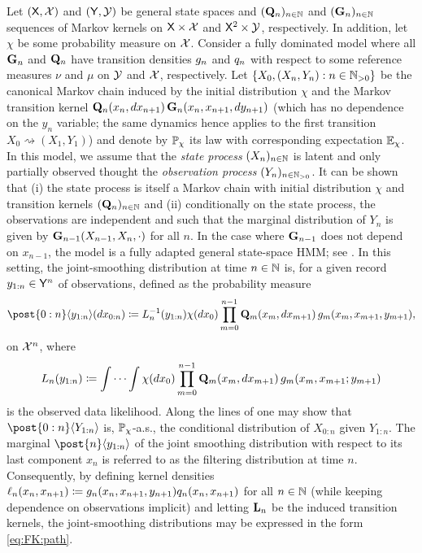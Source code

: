 \begin{example}
\label{ex:state-space:models}
Let $(\mathsf{X}, \mathcal{X})$ and $(\mathsf{Y}, \mathcal{Y})$ be general state spaces and $(\mathbf{Q}_n)_{n \in \mathbb{N}}$ and $(\mathbf{G}_n)_{n \in \mathbb{N}}$ sequences of Markov kernels on $\mathsf{X} \times \mathcal{X}$ and $\mathsf{X}^2 \times \mathcal{Y}$, respectively. In addition, let $\chi$ be some probability measure on $\mathcal{X}$. Consider a fully dominated model where all $\mathbf{G}_n$ and $\mathbf{Q}_n$ have transition densities $g_{n}$ and $q_{n}$ with respect to some reference measures $\nu$ and $\mu$ on $\mathcal{Y}$ and $\mathcal{X}$, respectively. Let $\{X_0, (X_n, Y_n) : n \in \mathbb{N}_{> 0}\}$ be the canonical Markov chain induced by the initial distribution $\chi$ and the Markov transition kernel $\mathbf{Q}_n(x_n, d x_{n + 1}) \, \mathbf{G}_n(x_n, x_{n + 1}, d y_{n + 1})$ (which has no dependence on the $y_n$ variable; the same dynamics hence applies to the first transition $X_0 \rightsquigarrow (X_1, Y_1)$) and denote by $\mathbb{P}_\chi$ its law with corresponding expectation $\mathbb{E}_\chi$. In this model, we assume that the \emph{state process} $(X_n)_{n \in \mathbb{N}}$ is latent and only partially observed thought the \emph{observation process} $(Y_n)_{n \in \mathbb{N}_{> 0}}$. It can be shown that (i) the state process is itself a Markov chain with initial distribution $\chi$ and transition kernels $(\mathbf{Q}_n)_{n \in \mathbb{N}}$ and (ii) conditionally on the state process, the observations are independent and such that the marginal distribution of $Y_n$ is given by $\mathbf{G}_{n - 1}(X_{n - 1}, X_n, \cdot)$ for all $n$. In the case where $\mathbf{G}_{n - 1}$ does not depend on $x_{n - 1}$, the model is a fully adapted general state-space HMM; see \cite[Section~2.2]{Cappe:2005:IHM:1088883}. In this setting, the joint-smoothing distribution at time $n \in \mathbb{N}$ is, for a given record $y_{1:n} \in \mathsf{Y}^n$ of observations, defined as the probability measure  
\begin{equation}
\label{eq:smooth}
    \post{0:n} \langle y_{1:n} \rangle (\rmd x_{0:n}) \eqdef \llh{n}^{-1}(y_{1:n}) \chi(\rmd x_0) \prod_{m = 0}^{n - 1} \hk_m(x_m, \rmd x_{m + 1}) \, \md{m}(x_m, x_{m + 1}, y_{m + 1}), 
\end{equation}
on $\mathcal{X}^n$, where   
\begin{equation}
    \label{eq:likelihood}
    \llh{n}(y_{1:n}) \eqdef \idotsint \chi(\rmd x_0) \prod_{m = 0}^{n - 1} \hk_m(x_m, \rmd x_{m + 1}) \, \md{m}(x_m, x_{m + 1}; y_{m + 1})
\end{equation}
is the observed data likelihood. Along the lines of \cite[Proposition~3.1.4]{Cappe:2005:IHM:1088883} one may show that $\post{0:n} \langle Y_{1:n} \rangle$ is, $\mathbb{P}_\chi$-a.s., the conditional distribution of $X_{0:n}$ given $Y_{1:n}$. The marginal  $\post{n} \langle y_{1:n} \rangle$ of the joint smoothing distribution with respect to its last component $x_n$ is referred to as the filtering distribution at time $n$. Consequently, by defining kernel densities $\ell_{n}(x_n, x_{n + 1}) \coloneqq g_{n}(x_n, x_{n + 1}, y_{n + 1}) q_{n}(x_n, x_{n + 1})$ for all $n \in \mathbb{N}$ (while keeping dependence on observations implicit) and letting $\mathbf{L}_{n}$ be the induced transition kernels, the joint-smoothing distributions may be expressed in the form \eqref{eq:FK:path}.
\end{example}

